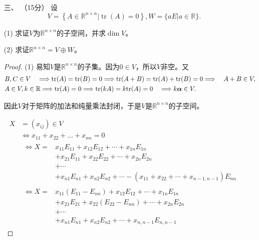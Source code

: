 \begin{enumerate}[1~]
\item[三、]（15分）
设\[
V = \left\{ A \in \mathbb { R } ^ { n \times n } | \operatorname { tr } ( A ) = 0 \right\} , W = \{ a E | a \in \mathbb { R } \}.
\]

(1) 求证$V$为$\mathbb{R}^{n\times n}$的子空间，并求$\dim V$。

(2) 求证$\mathbb{R}^{n\times n}=V\oplus W$。

\begin{proof}

(1) 易知$V$是$\mathbb{R}^{n\times n}$的子集。因为$0  \in V$，所以$V$非空。又
\begin{align*}
&B , C \in V \quad \Longrightarrow {\rm tr}(A)={\rm tr}(B)=0 \Longrightarrow {\rm tr}(A+B)={\rm tr}(A)+{\rm tr}(B)=0\Longrightarrow \quad A + B \in V,\\
&A \in V , k \in \mathbb{R}\Longrightarrow{\rm tr}(A)=0\Longrightarrow{\rm tr}(kA)=k{\rm tr}(A)=0 \quad \Longrightarrow k \boldsymbol{\alpha} \in V.
\end{align*}

因此$V$对于矩阵的加法和纯量乘法封闭，于是$V$是$\mathbb{R}^{n\times n}$的子空间。

\begin{align*}
X&=(x_{ij})\in V\\
&\Longleftrightarrow x _ { 11 } + x _ { 22 } + \dots + x _ { n n } = 0\\
& \begin{aligned} \Longleftrightarrow X  = & x _ { 11 } E _ { 11 } + x _ { 12 } E _ { 12 } + \cdots + x _ { 1 n } E _ { 1 n } \\ & + x _ { 21 } E _ { 11 } + x _ { 22 } E _ { 22 } + \cdots + x _ { 2 n } E _ { 2 n } \\ & + \cdots \\ & + x _ { n 1 } E _ { n 1 } + x _ { n 2 } E _ { n 2 } + \cdots - \left( x _ { 11 } + x _ { 22 } + \cdots + x _ { n - 1 , n - 1 } \right) E _ { n n } \end{aligned}\\
& \begin{aligned}\Longleftrightarrow X = & x _ { 11 } \left( E _ { 11 } - E _ { n n } \right) + x _ { 12 } E _ { 12 } + \cdots + x _ { 1 n } E _ { 1 n } \\ & + x _ { 21 } E _ { 21 } + x _ { 22 } \left( E _ { 22 } - E _ { n n } \right) + \cdots + x _ { 2 n } E _ { 2 n } \\ & + \cdots \\ & + x _ { n 1 } E _ { n 1 } + x _ { n 2 } E _ { n 2 } + \cdots + x _ { n , n - 1 } E _ { n , n - 1 } \end{aligned}
\end{align*}


\end{proof}
\end{enumerate}
